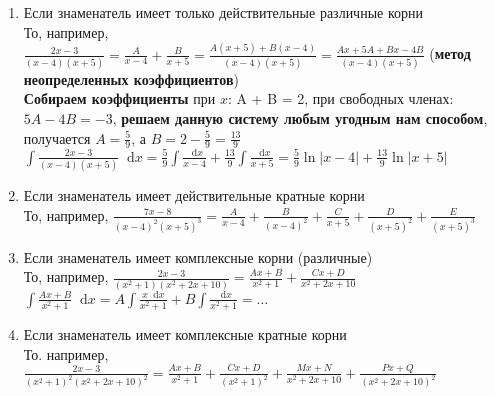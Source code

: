 \documentclass{article}
\newcommand*\diff{\mathop{}\!\mathrm{d}}
\begin{document}
\begin{enumerate}
    \item Если знаменатель имеет только действительные различные корни \\
    То, например, $\frac{2 x - 3}{(x - 4)(x + 5)} = \frac{A}{x - 4} + \frac{B}{x + 5} = \frac{A(x + 5) + B(x - 4)}{(x - 4)(x + 5)} = \frac{A x + 5 A + B x - 4 B}{(x - 4)(x + 5)}$ (\textbf{метод неопределенных коэффициентов}) \\
    \textbf{Собираем коэффициенты} при $x$: A + B = 2, при свободных членах: $5 A - 4 B = -3$, \textbf{решаем данную систему любым угодным нам способом}, получается $A = \frac{5}{9}$, а $B = 2 - \frac{5}{9} = \frac{13}{9}$ \\
    $\int \frac{2 x - 3}{(x - 4)(x + 5)} \diff x = \frac{5}{9} \int \frac{\diff x}{x - 4} + \frac{13}{9} \int \frac{\diff x}{x + 5}= \frac{5}{9} \ln |x - 4| + \frac{13}{9} \ln |x + 5|$
    \item Если знаменатель имеет действительные кратные корни \\
    То, например, $\frac{7 x - 8}{(x - 4)^{2} (x+5)^{3}} = \frac{A}{x - 4} + \frac{B}{(x - 4)^2} + \frac{C}{x + 5} + \frac{D}{(x + 5)^2} + \frac{E}{(x + 5)^3}$
    \item Если знаменатель имеет комплексные корни (различные) \\
    То, например, $\frac{2 x - 3}{(x^2 + 1) (x^2 + 2 x + 10)} = \frac{A x + B}{x^2 + 1} + \frac{C x + D}{x^2 + 2x + 10}$ \\
    $\int \frac{A x + B}{x^2 + 1} \diff x = A \int \frac{x \diff x}{x^2 + 1} + B \int \frac{\diff x}{x^2 + 1} = \dots$
    \item Если знаменатель имеет комплексные кратные корни \\
    То. например, $\frac{2 x - 3}{(x^2 + 1)^2 (x^2 + 2x + 10)^2} = \frac{A x + B}{x^2 + 1} + \frac{C x + D}{(x^2 + 1)^2} + \frac{M x + N}{x^2 + 2x + 10} + \frac{P x + Q}{(x^2 + 2x + 10)^2}$
\end{enumerate}
\end{document}
